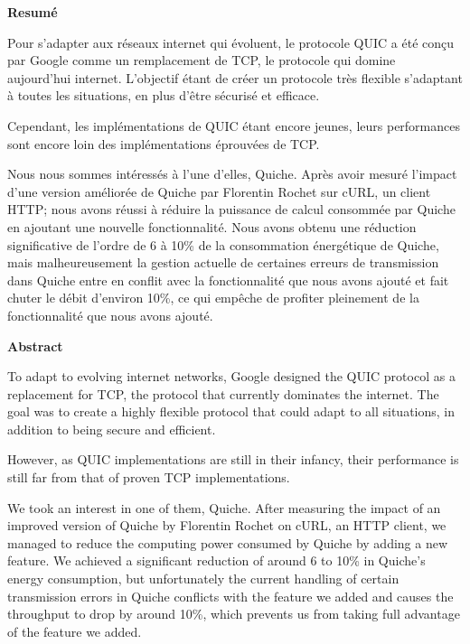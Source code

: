 \begin{center}
    \bf Resumé
\end{center}

Pour s'adapter aux réseaux internet qui évoluent, le protocole QUIC a été conçu par Google comme un remplacement de TCP, le protocole qui domine aujourd'hui internet.
L'objectif étant de créer un protocole très flexible s'adaptant à toutes les situations, en plus d'être sécurisé et efficace.

Cependant, les implémentations de QUIC étant encore jeunes, leurs performances sont encore loin des implémentations éprouvées de TCP.

Nous nous sommes intéressés à l'une d'elles, Quiche. Après avoir mesuré l'impact d'une version améliorée de Quiche par Florentin Rochet sur cURL, un client HTTP; nous avons réussi à réduire la puissance de calcul consommée par Quiche en ajoutant une nouvelle fonctionnalité.
Nous avons obtenu une réduction significative de l'ordre de 6 à 10\% de la consommation énergétique de Quiche, mais malheureusement la gestion actuelle de certaines erreurs de transmission dans Quiche entre en conflit avec la fonctionnalité que nous avons ajouté et fait chuter le débit d'environ 10\%, ce qui empêche de profiter pleinement de la fonctionnalité que nous avons ajouté.


\begin{center}
    \bf Abstract
\end{center}

To adapt to evolving internet networks, Google designed the QUIC protocol as a replacement for TCP, the protocol that currently dominates the internet.
The goal was to create a highly flexible protocol that could adapt to all situations, in addition to being secure and efficient.

However, as QUIC implementations are still in their infancy, their performance is still far from that of proven TCP implementations.

We took an interest in one of them, Quiche. After measuring the impact of an improved version of Quiche by Florentin Rochet on cURL, an HTTP client, we managed to reduce the computing power consumed by Quiche by adding a new feature.
We achieved a significant reduction of around 6 to 10\% in Quiche's energy consumption, but unfortunately the current handling of certain transmission errors in Quiche conflicts with the feature we added and causes the throughput to drop by around 10\%, which prevents us from taking full advantage of the feature we added.

